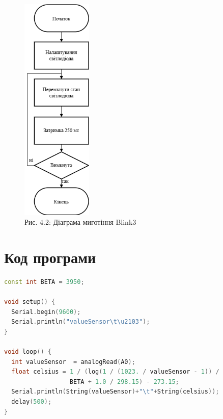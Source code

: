 \documentclass[a4paper]{article}
\begin{document}
\begin{figure}[h]
    \centering
    \includegraphics[width=0.3\textwidth]{imgs/LW4.0.2.drawio.png}
    \caption*{Рис. 4.2: Діаграма миготіння Blink3}
\end{figure} 

\newpage 




\section*{Код програми}
\begin{lstlisting}[language=C++, caption=Програма для вимірювання температури]
const int BETA = 3950;

void setup() {
  Serial.begin(9600);
  Serial.println("valueSensor\t\u2103");
}

void loop() {
  int valueSensor  = analogRead(A0);
  float celsius = 1 / (log(1 / (1023. / valueSensor - 1)) /
                  BETA + 1.0 / 298.15) - 273.15;
  Serial.println(String(valueSensor)+"\t"+String(celsius));
  delay(500);
}
\end{lstlisting}
\end{document}
